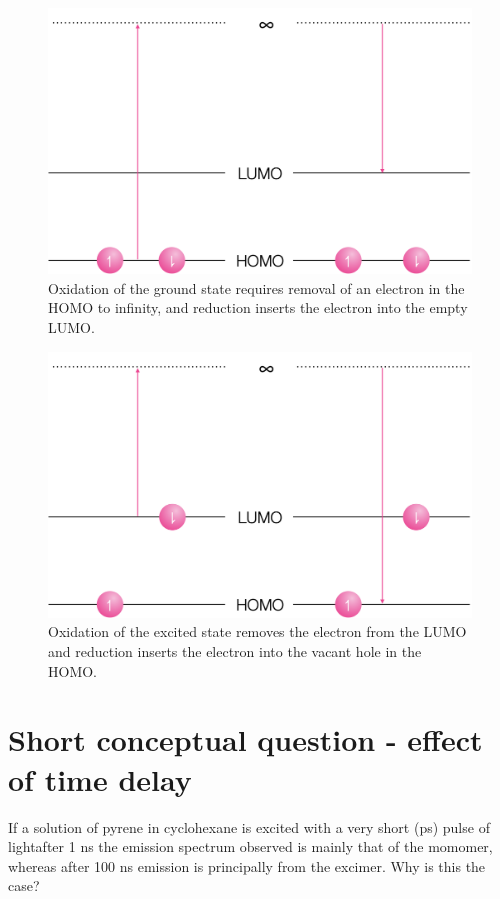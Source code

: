 \documentclass[
]{book}
\begin{document}
\begin{figure}

{\centering \includegraphics[width=0.7\linewidth]{images/gsredox} 

}

\caption{Oxidation of the ground state requires removal of an electron in the HOMO to infinity, and reduction inserts the electron into the empty LUMO.}\label{fig:gsredox}
\end{figure}

\begin{figure}

{\centering \includegraphics[width=0.7\linewidth]{images/excitedredox} 

}

\caption{Oxidation of the excited state removes the electron from the LUMO and reduction inserts the electron into the vacant hole in the HOMO.}\label{fig:excitedredox}
\end{figure}

\hypertarget{short-conceptual-question---effect-of-time-delay}{%
\section{Short conceptual question - effect of time delay}\label{short-conceptual-question---effect-of-time-delay}}

If a solution of pyrene in cyclohexane is excited with a very short (ps) pulse of lightafter 1 ns the emission spectrum observed is mainly that of the momomer, whereas after 100 ns emission is principally from the excimer. Why is this the case?
\end{document}
